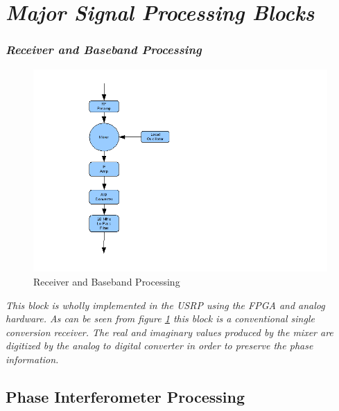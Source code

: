 \documentclass[a4paper]{report}
\newcommand\textstyleEmphasis[1]{\textit{#1}}
\numberwithin{equation}{chapter}
\begin{document}
\section[Major Signal Processing Blocks]{\textstyleEmphasis{\textup{Major Signal Processing Blocks}}}
\subsubsection[Receiver and Baseband Processing]{\textstyleEmphasis{\textup{Receiver and Baseband
Processing}}}

\begin{figure}
\centering 
\includegraphics{Passive-Weather-Radar-Theory-fig-04.png}
\caption[Receiver and Baseband Processing]{Receiver and Baseband Processing}
\label{fig:04}
\end{figure}

\textstyleEmphasis{\textup{This block is wholly implemented in the USRP using the FPGA and analog hardware. As can be seen from figure \ref{fig:04} this block is a conventional single conversion receiver. The real and imaginary values produced by the mixer are digitized by the analog to digital converter in order to preserve the phase information.}}

\subsection[Phase Interferometer Processing]{Phase Interferometer Processing}

\end{document}
